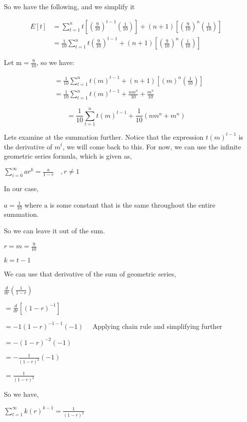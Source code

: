 \documentclass[10pt]{article}
\begin{document}
So we have the following, and we simplify it

$$
\begin{aligned}
E[t] & =\sum_{t=1}^{n} t\left[\left(\frac{9}{10}\right)^{t-1}\left(\frac{1}{10}\right)\right]+(n+1)\left[\left(\frac{9}{10}\right)^{n}\left(\frac{1}{10}\right)\right] \\
& =\frac{1}{10} \sum_{t=1}^{n} t\left(\frac{9}{10}\right)^{t-1}+(n+1)\left[\left(\frac{9}{10}\right)^{n}\left(\frac{1}{10}\right)\right]
\end{aligned}
$$

Let $\mathrm{m}=\frac{9}{10}$, so we have:

$$
\begin{aligned}
& =\frac{1}{10} \sum_{t=1}^{n} t(m)^{t-1}+(n+1)\left[(m)^{n}\left(\frac{1}{10}\right)\right] \\
& =\frac{1}{10} \sum_{t=1}^{n} t(m)^{t-1}+\frac{n m^{n}}{10}+\frac{m^{n}}{10}
\end{aligned}
$$

$$
=\frac{1}{10} \sum_{t=1}^{n} t(m)^{t-1}+\frac{1}{10}\left(n m^{n}+m^{n}\right)
$$

Lets examine at the summation further. Notice that the expression $t(m)^{t-1}$ is the derivative of $m^{t}$, we will come back to this. For now, we can use the infinite geometric series formula, which is given as,

$\sum_{i=0}^{\infty} a r^{k}=\frac{a}{1-r} \quad, r \neq 1$

In our case,

$a=\frac{1}{10}$ where $\mathrm{a}$ is some constant that is the same throughout the entire summation.

So we can leave it out of the sum.

$r=m=\frac{9}{10}$

$k=t-1$

We can use that derivative of the sum of geometric series,

$\frac{d}{d r}\left(\frac{1}{1-r}\right)$

$=\frac{d}{d r}\left[(1-r)^{-1}\right]$

$=-1(1-r)^{-1-1}(-1) \quad$ Applying chain rule and simplifying further

$=-(1-r)^{-2}(-1)$

$=-\frac{1}{(1-r)^{2}}(-1)$

$=\frac{1}{(1-r)^{2}}$

So we have,

$\sum_{t=1}^{\infty} k(r)^{k-1}=\frac{1}{(1-r)^{2}}$
\end{document}
